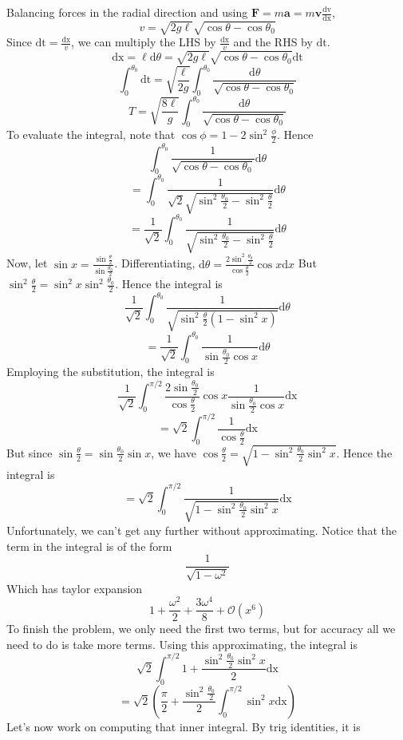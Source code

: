 \documentclass[11pt]{scrartcl}
\newcommand{\ca}[1]{\mathrm{#1}}
\begin{document}
\begin{soln}
  Balancing forces in the radial direction and using $\mathbf{F}=m\mathbf{a}=m\mathbf{v}\frac{\ca{dv}}{\ca{dx}}$,
  $$v=\sqrt{2g\ell}\sqrt{\cos\theta-\cos\theta_0}$$
  Since $\ca{dt}=\frac{\ca{dx}}{v}$, we can multiply the LHS by $\frac{\ca{dx}}{v}$ and the RHS by $\ca{dt}$.
  $$\ca{dx}=\ell\ca{d}\theta=\sqrt{2g\ell}\sqrt{\cos\theta-\cos\theta_0}\ca{dt}$$
  $$\int_0^{\theta_0}\ca{dt}=\sqrt{\frac{\ell}{2g}}\int_{0}^{\theta_0}\frac{\ca{d}\theta}{\sqrt{\cos\theta-\cos\theta_0}}$$
  $$T=\sqrt{\frac{8\ell}{g}}\int_{0}^{\theta_0}\frac{\ca{d}\theta}{\sqrt{\cos\theta-\cos\theta_0}}$$
  To evaluate the integral, note that $\cos\phi=1-2\sin^2\frac{\phi}{2}$. Hence
  $$\int_0^{\theta_0}\frac{1}{\sqrt{\cos\theta-\cos\theta_0}}\ca{d}\theta$$
  $$=\int_0^{\theta_0}\frac{1}{\sqrt{2}\sqrt{\sin^2\frac{\theta_0}{2}-\sin^2\frac{\theta}{2}}}\ca{d}\theta$$
  $$=\frac{1}{\sqrt{2}}\int_0^{\theta_0}\frac{1}{\sqrt{\sin^2\frac{\theta_0}{2}-\sin^2\frac{\theta}{2}}}\ca{d}\theta$$
  Now, let $\sin x=\frac{\sin\frac{\theta}{2}}{\sin\frac{\theta_0}{2}}$.
  Differentiating, $\ca{d}\theta=\frac{2\sin^2\frac{\theta_0}{2}}{\cos\frac{\theta}{2}}\cos x\ca{d}x$
  But $\sin^2 \frac{\theta}{2}=\sin^2 x\sin^2 \frac{\theta_0}{2}$. Hence the integral is
  $$\frac{1}{\sqrt{2}}\int_0^{\theta_0}\frac{1}{\sqrt{\sin^2\frac{\theta}{2}(1-\sin^2 x)}}\ca{d}\theta$$
  $$=\frac{1}{\sqrt{2}}\int_0^{\theta_0}\frac{1}{\sin\frac{\theta_0}{2}\cos x}\ca{d}\theta$$
  Employing the substitution, the integral is
  $$\frac{1}{\sqrt{2}}\int_0^{\pi/2}\frac{2\sin\frac{\theta_0}{2}}{\cos\frac{\theta}{2}}\cos x\frac{1}{\sin\frac{\theta_0}{2}\cos x}\ca{dx}$$
  $$=\sqrt{2}\int_0^{\pi/2}\frac{1}{\cos\frac{\theta}{2}}\ca{dx}$$
  But since $\sin\frac{\theta}{2}=\sin\frac{\theta_0}{2}\sin x$, we have
  $\cos\frac{\theta}{2}=\sqrt{1-\sin^2\frac{\theta_0}{2}\sin^2 x}$. Hence the integral is
  $$=\sqrt{2}\int_0^{\pi/2}\frac{1}{\sqrt{1-\sin^2\frac{\theta_0}{2}\sin^2 x}}\ca{dx}$$
  Unfortunately, we can't get any further without approximating. Notice that the term in the integral
  is of the form
  $$\frac{1}{\sqrt{1-\omega^2}}$$
  Which has taylor expansion
  $$1+\frac{\omega^2}{2}+\frac{3\omega^4}{8}+\mathcal{O}(x^6)$$
  To finish the problem, we only need the first two terms, but for accuracy all we need to do is take more terms.
  Using this approximating, the integral is
  $$\sqrt{2}\int_0^{\pi/2}1+\frac{\sin^2 \frac{\theta_0}{2}\sin^2 x}{2}\ca{dx}$$
  $$=\sqrt{2}\left(\frac{\pi}{2}+\frac{\sin^2\frac{\theta_0}{2}}{2}\int_0^{\pi/2}\sin^2 x\ca{dx}\right)$$
  Let's now work on computing that inner integral. By trig identities, it is

\end{soln}
\end{document}
